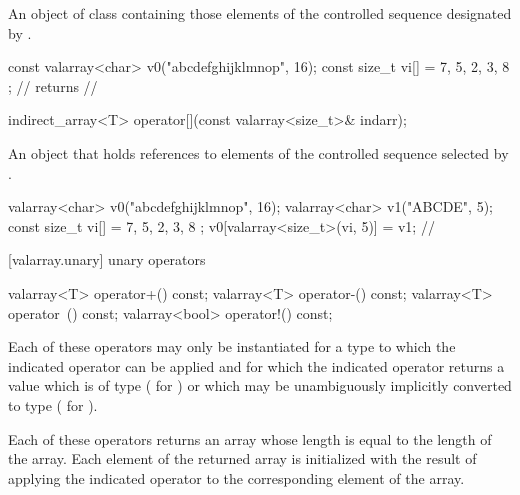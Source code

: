 \begin{itemdescr}
\pnum
\returns An object of class  containing those
elements of the controlled sequence designated by .
\enterexample
\begin{codeblock}
const valarray<char> v0("abcdefghijklmnop", 16);
const size_t vi[] = { 7, 5, 2, 3, 8 };
//  returns
// 
\end{codeblock}
\exitexample
\end{itemdescr}

%
\begin{itemdecl}
indirect_array<T> operator[](const valarray<size_t>& indarr);
\end{itemdecl}

\begin{itemdescr}
\pnum
\returns An object that holds references to elements of the controlled
sequence selected by . \enterexample
\begin{codeblock}
valarray<char> v0("abcdefghijklmnop", 16);
valarray<char> v1("ABCDE", 5);
const size_t vi[] = { 7, 5, 2, 3, 8 };
v0[valarray<size_t>(vi, 5)] = v1;
// 
\end{codeblock}
\exitexample
\end{itemdescr}

[valarray.unary]{ unary operators}

%
%
%
%
\begin{itemdecl}
valarray<T> operator+() const;
valarray<T> operator-() const;
valarray<T> operator~() const;
valarray<bool> operator!() const;
\end{itemdecl}

\begin{itemdescr}
\pnum
Each of these operators may only be instantiated for a type 
to which the indicated operator can be applied and for which the indicated
operator returns a value which is of type  ( for
) or which may be unambiguously implicitly converted to type
 ( for ).

\pnum
Each of these operators returns an array whose length is equal to the length
of the array.
Each element of the returned array is initialized with the result of
applying the indicated operator to the corresponding element of the array.
\end{itemdescr}


